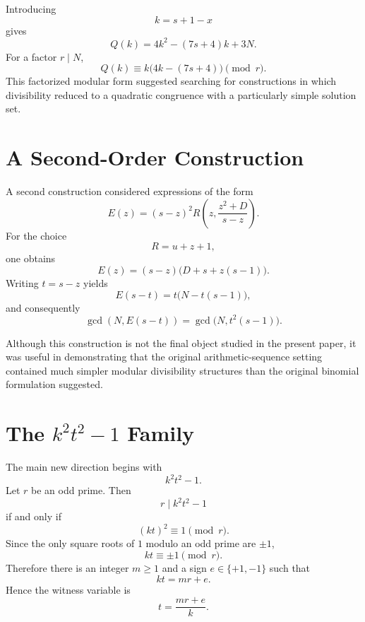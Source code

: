 \documentclass[11pt,a4paper]{article}
\begin{document}
Introducing
\[
    k=s+1-x
\]
gives
\begin{equation}
    Q(k)=4k^2-(7s+4)k+3N.
\end{equation}
For a factor $r\mid N$,
\begin{equation}
    Q(k)\equiv k\bigl(4k-(7s+4)\bigr)\pmod r.
\end{equation}
This factorized modular form suggested searching for constructions in which divisibility reduced to a quadratic congruence with a particularly simple solution set.

\section{A Second-Order Construction}

A second construction considered expressions of the form
\begin{equation}
    E(z)=(s-z)^2R\left(z,\frac{z^2+D}{s-z}\right).
\end{equation}
For the choice
\[
    R=u+z+1,
\]
one obtains
\begin{equation}
    E(z)=(s-z)\bigl(D+s+z(s-1)\bigr).
\end{equation}
Writing $t=s-z$ yields
\begin{equation}
    E(s-t)=t\bigl(N-t(s-1)\bigr),
\end{equation}
and consequently
\begin{equation}
    \gcd(N,E(s-t))
    =
    \gcd\bigl(N,t^2(s-1)\bigr).
\end{equation}

Although this construction is not the final object studied in the present paper, it was useful in demonstrating that the original arithmetic-sequence setting contained much simpler modular divisibility structures than the original binomial formulation suggested.

\section{The $k^2t^2-1$ Family}

The main new direction begins with
\begin{equation}
    k^2t^2-1.
\end{equation}
Let $r$ be an odd prime. Then
\begin{equation}
    r\mid k^2t^2-1
\end{equation}
if and only if
\begin{equation}
    (kt)^2\equiv1\pmod r.
\end{equation}
Since the only square roots of $1$ modulo an odd prime are $\pm1$,
\begin{equation}
    kt\equiv\pm1\pmod r.
\end{equation}
Therefore there is an integer $m\ge1$ and a sign $e\in\{+1,-1\}$ such that
\begin{equation}
    kt=mr+e.
\end{equation}
Hence the witness variable is
\begin{equation}
    \boxed{
    t=\frac{mr+e}{k}.
    }
\end{equation}
\end{document}
